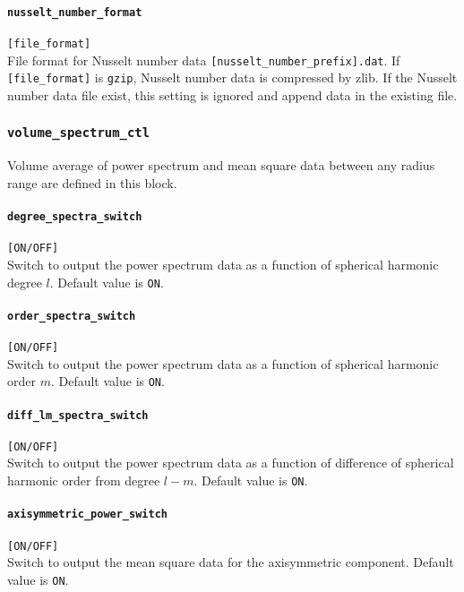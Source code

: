 \paragraph{\tt nusselt\_number\_format}
\label{href_t:nusselt_number_format}
\verb|[file_format]| \\
File format for Nusselt number data \verb|[nusselt_number_prefix].dat|. If \verb|[file_format]| is \verb|gzip|, Nusselt number data is compressed by zlib.  If the Nusselt number data file exist, this setting is ignored and append data in the existing file.

%
\subsubsection{\tt volume\_spectrum\_ctl}
\label{href_t:volume_spectrum_ctl}
Volume average of power spectrum and mean square data between any radius range are defined in this block.

\paragraph{\tt degree\_spectra\_switch}
\label{href_t:degree_spectra_switch}
\verb|[ON/OFF]| \\
Switch to output the power spectrum data as a function of spherical harmonic degree $l$. Default value is {\tt ON}.

\paragraph{\tt order\_spectra\_switch}
\label{href_t:order_spectra_switch}
\verb|[ON/OFF]| \\
Switch to output the power spectrum data as a function of spherical harmonic order $m$. Default value is {\tt ON}.

\paragraph{\tt diff\_lm\_spectra\_switch}
\label{href_t:diff_lm_spectra_switch}
\verb|[ON/OFF]| \\
Switch to output the power spectrum data as a function of difference of spherical harmonic order from degree $l-m$. Default value is {\tt ON}.

\paragraph{\tt axisymmetric\_power\_switch}
\label{href_t:axisymmetric_power_switch}
\verb|[ON/OFF]| \\
Switch to output the mean square data for the axisymmetric component. Default value is {\tt ON}.

